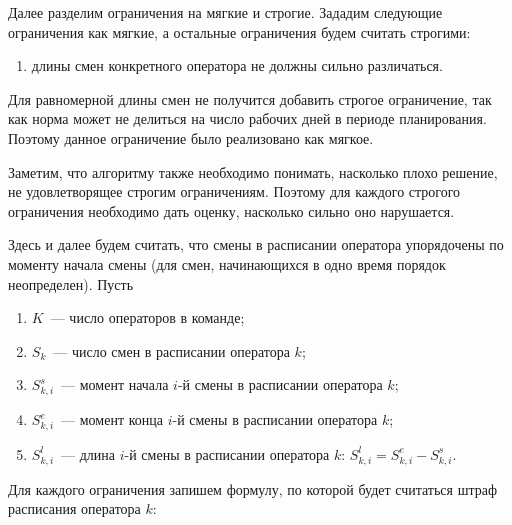 \documentclass[times,specification,annotation]{itmo-student-thesis}
\begin{document}
Далее разделим ограничения на мягкие и строгие.
Зададим следующие ограничения как мягкие, а остальные ограничения будем считать строгими:

\begin{enumerate}
    \item длины смен конкретного оператора не должны сильно различаться.
\end{enumerate}

Для равномерной длины смен не получится добавить строгое ограничение,
так как норма может не делиться на число рабочих дней в периоде планирования.
Поэтому данное ограничение было реализовано как мягкое.

Заметим, что алгоритму также необходимо понимать, насколько плохо решение, не удовлетворящее строгим ограничениям.
Поэтому для каждого строгого ограничения необходимо дать оценку, насколько сильно оно нарушается.

Здесь и далее будем считать, что смены в расписании оператора упорядочены по моменту начала смены (для смен, начинающихся в одно время порядок неопределен).
Пусть
\begin{enumerate}
    \item $K$~--- число операторов в команде;
    \item $S_k$~--- число смен в расписании оператора $k$;
    \item $S^s_{k, i}$~--- момент начала $i$-й смены в расписании оператора $k$;
    \item $S^e_{k, i}$~--- момент конца $i$-й смены в расписании оператора $k$;
    \item $S^l_{k, i}$~--- длина $i$-й смены в расписании оператора $k$: $S^l_{k, i} = S^e_{k, i} - S^s_{k, i}$.
\end{enumerate}

Для каждого ограничения запишем формулу, по которой будет считаться штраф расписания оператора $k$:
\end{document}
